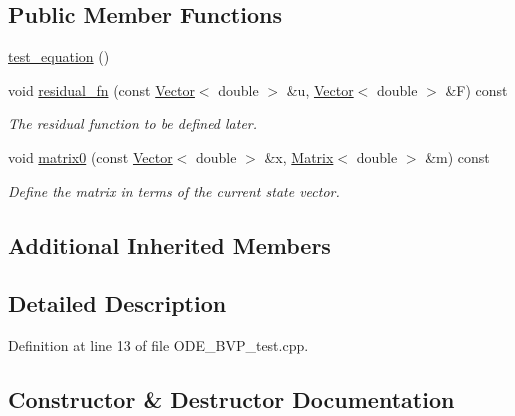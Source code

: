 \subsection*{Public Member Functions}
\begin{DoxyCompactItemize}
\item 
\hyperlink{classLuna_1_1test__equation_a76186f65e923b54c7e73faffbcefb30d}{test\+\_\+equation} ()
\item 
void \hyperlink{classLuna_1_1test__equation_a90a4576ce51729e49dbe67f36ab31f81}{residual\+\_\+fn} (const \hyperlink{classLuna_1_1Vector}{Vector}$<$ double $>$ \&u, \hyperlink{classLuna_1_1Vector}{Vector}$<$ double $>$ \&F) const
\begin{DoxyCompactList}\small\item\em The residual function to be defined later. \end{DoxyCompactList}\item 
void \hyperlink{classLuna_1_1test__equation_a955940cd7cc59fbaef213151075f1838}{matrix0} (const \hyperlink{classLuna_1_1Vector}{Vector}$<$ double $>$ \&x, \hyperlink{classLuna_1_1Matrix}{Matrix}$<$ double $>$ \&m) const
\begin{DoxyCompactList}\small\item\em Define the matrix in terms of the current state vector. \end{DoxyCompactList}\end{DoxyCompactItemize}
\subsection*{Additional Inherited Members}


\subsection{Detailed Description}


Definition at line 13 of file O\+D\+E\+\_\+\+B\+V\+P\+\_\+test.\+cpp.



\subsection{Constructor \& Destructor Documentation}
\mbox{\label{classLuna_1_1test__equation_a76186f65e923b54c7e73faffbcefb30d}} 
